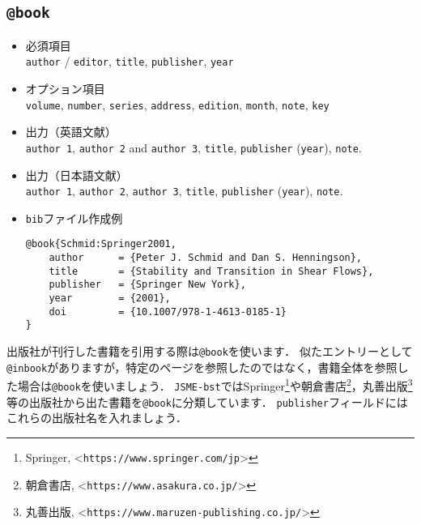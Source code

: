 \documentclass[a4paper,fleqn,uplatex,dvipdfmx]{jsarticle}
\makeatletter
\newcommand{\JSMErepos}{\texttt{JSME-bst}}
\newcommand{\ttbook}{\texttt{@book}}
\newcommand{\ttinbook}{\texttt{@inbook}}
\makeatother
\begin{document}
\subsection{\ttbook}
\label{ssec:book}
\begin{screen}
    \begin{itemize}
        \item 必須項目 \\
        \verb|author| / \verb|editor|, \verb|title|, \verb|publisher|, \verb|year|
        \item オプション項目 \\
        \verb|volume|, \verb|number|, \verb|series|, \verb|address|, \verb|edition|, \verb|month|, \verb|note|, \verb|key|
        \item 出力（英語文献） \\
            \colorbox[gray]{0.8}{\texttt{author 1}}, \colorbox[gray]{0.8}{\texttt{author 2}} and \colorbox[gray]{0.8}{\texttt{author 3}}, \colorbox[gray]{0.8}{\texttt{title}}, \colorbox[gray]{0.8}{\texttt{publisher}} (\colorbox[gray]{0.8}{\texttt{year}}), \colorbox[gray]{0.8}{\texttt{note}}.
        \item 出力（日本語文献） \\
            \colorbox[gray]{0.8}{\texttt{author 1}}, \colorbox[gray]{0.8}{\texttt{author 2}}, \colorbox[gray]{0.8}{\texttt{author 3}}, \colorbox[gray]{0.8}{\texttt{title}}, \colorbox[gray]{0.8}{\texttt{publisher}} (\colorbox[gray]{0.8}{\texttt{year}}), \colorbox[gray]{0.8}{\texttt{note}}.
        \item \verb|bib|ファイル作成例 \vspace{-3mm}
\begin{verbatim}
@book{Schmid:Springer2001,
    author      = {Peter J. Schmid and Dan S. Henningson},
    title       = {Stability and Transition in Shear Flows},
    publisher   = {Springer New York},
    year        = {2001},
    doi         = {10.1007/978-1-4613-0185-1}
}
\end{verbatim}
    \end{itemize}
\end{screen}

出版社が刊行した書籍を引用する際は\ttbook を使います．
似たエントリーとして\ttinbook がありますが，特定のページを参照したのではなく，書籍全体を参照した場合は\ttbook を使いましょう．
\JSMErepos ではSpringer\footnote{Springer, \textless\verb|https://www.springer.com/jp|\textgreater}や朝倉書店\footnote{朝倉書店, \textless\verb|https://www.asakura.co.jp/|\textgreater}，丸善出版\footnote{丸善出版, \textless\verb|https://www.maruzen-publishing.co.jp/|\textgreater}等の出版社から出た書籍を\ttbook に分類しています．
\verb|publisher|フィールドにはこれらの出版社名を入れましょう．
\end{document}
